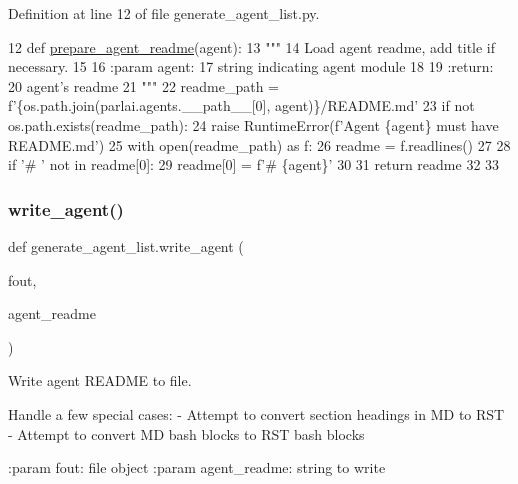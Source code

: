 Definition at line 12 of file generate\+\_\+agent\+\_\+list.\+py.


\begin{DoxyCode}
12 \textcolor{keyword}{def }\hyperlink{namespacegenerate__agent__list_a321a9312fef0cf377ee0e8a870ee0741}{prepare\_agent\_readme}(agent):
13     \textcolor{stringliteral}{"""}
14 \textcolor{stringliteral}{    Load agent readme, add title if necessary.}
15 \textcolor{stringliteral}{}
16 \textcolor{stringliteral}{    :param agent:}
17 \textcolor{stringliteral}{        string indicating agent module}
18 \textcolor{stringliteral}{}
19 \textcolor{stringliteral}{    :return:}
20 \textcolor{stringliteral}{        agent's readme}
21 \textcolor{stringliteral}{    """}
22     readme\_path = f\textcolor{stringliteral}{'\{os.path.join(parlai.agents.\_\_path\_\_[0], agent)\}/README.md'}
23     \textcolor{keywordflow}{if} \textcolor{keywordflow}{not} os.path.exists(readme\_path):
24         \textcolor{keywordflow}{raise} RuntimeError(f\textcolor{stringliteral}{'Agent \{agent\} must have README.md'})
25     with open(readme\_path) \textcolor{keyword}{as} f:
26         readme = f.readlines()
27 
28     \textcolor{keywordflow}{if} \textcolor{stringliteral}{'# '} \textcolor{keywordflow}{not} \textcolor{keywordflow}{in} readme[0]:
29         readme[0] = f\textcolor{stringliteral}{'# \{agent\}'}
30 
31     \textcolor{keywordflow}{return} readme
32 
33 
\end{DoxyCode}
\mbox{\label{namespacegenerate__agent__list_aa2e399b6d39f8bb4e2f2ef644f082ac7}} 
\subsubsection{\texorpdfstring{write\+\_\+agent()}{write\_agent()}}
{\footnotesize\ttfamily def generate\+\_\+agent\+\_\+list.\+write\+\_\+agent (\begin{DoxyParamCaption}\item[{}]{fout,  }\item[{}]{agent\+\_\+readme }\end{DoxyParamCaption})}

\begin{DoxyVerb}Write agent README to file.

Handle a few special cases:
- Attempt to convert section headings in MD to RST
- Attempt to convert MD bash blocks to RST bash blocks

:param fout:
    file object
:param agent_readme:
    string to write
\end{DoxyVerb}
 

